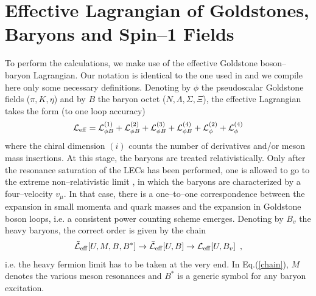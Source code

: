 \vfill

\section{Effective Lagrangian of Goldstones, Baryons and Spin--1 Fields}

To perform the calculations, we make use of the effective
Goldstone boson--baryon Lagrangian. Our notation is identical to the one
used in \cite{bkmz} and we compile here only some necessary definitions.
Denoting by $\phi$ the pseudoscalar Goldstone fields ($\pi, K, \eta$) and
by $B$ the baryon octet ($N,\Lambda,\Sigma,\Xi$),
the  effective Lagrangian takes the form
(to one loop accuracy)
\begin{equation}
{\cal L}_{\rm eff} = {\cal L}_{\phi B}^{(1)} +  {\cal L}_{\phi B}^{(2)} +
  {\cal L}_{\phi B}^{(3)} +
  {\cal L}_{\phi B}^{(4)} + {\cal L}_{\phi}^{(2)}+ {\cal L}_{\phi}^{(4)}
\label{leff}
\end{equation}
where the chiral dimension $(i)$ counts the number of derivatives
and/or meson mass insertions. At this stage, the baryons are treated
relativistically. Only after the resonance saturation of the LECs
has been performed, one is allowed to go to the extreme
non--relativistic limit \cite{jm,bkkm}, in which the baryons are characterized
by a four--velocity $v_\mu$. In that case, there is a one--to--one
correspondence between the expansion in small momenta and quark masses
and the expansion in Goldstone boson loops, i.e. a consistent power
counting scheme emerges.  Denoting by $B_v$ the heavy baryons, the
correct order is given by the chain
\begin{equation}
\tilde{{\cal L}}_{\rm eff} [U, M , B, B^*] \to
\bar{{\cal L}}_{\rm eff} [U, B] \to {\cal L}_{\rm eff} [U, B_v] \, \, \, ,
\label{chain}
\end{equation}
i.e. the heavy fermion limit has to be taken at the very end.
In Eq.(\ref{chain}), $M$ denotes the various meson resonances and $B^*$
is a generic symbol for any baryon excitation.

